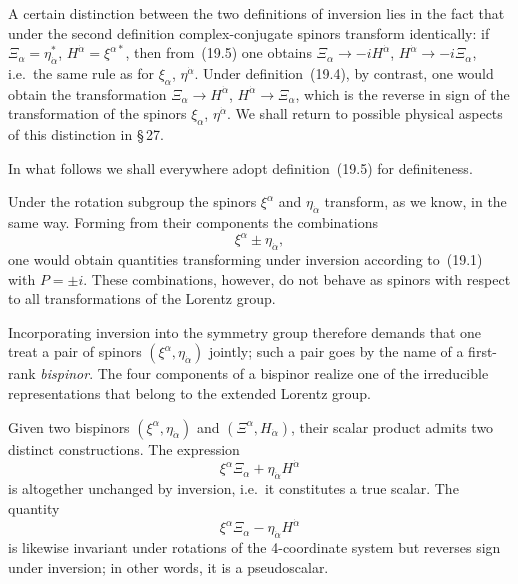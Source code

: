 A certain distinction between the two definitions of inversion lies in the fact that under the second definition complex-conjugate spinors transform identically: if $\Xi_\alpha = \eta^*_{\dot\alpha}$, $H^{\dot\alpha} = \xi^{\alpha*}$, then from~(19.5) one obtains $\Xi_\alpha \to -iH^{\dot\alpha}$, $H^{\dot\alpha} \to -i\Xi_\alpha$, i.e.\ the same rule as for $\xi_\alpha$, $\eta^{\dot\alpha}$. Under definition~(19.4), by contrast, one would obtain the transformation $\Xi_\alpha \to H^{\dot\alpha}$, $H^{\dot\alpha} \to \Xi_\alpha$, which is the reverse in sign of the transformation of the spinors $\xi_\alpha$, $\eta^{\dot\alpha}$. We shall return to possible physical aspects of this distinction in \S\,27.

In what follows we shall everywhere adopt definition~(19.5) for definiteness.

Under the rotation subgroup the spinors $\xi^\alpha$ and $\eta_{\dot\alpha}$ transform, as we know, in the same way. Forming from their components the combinations
\begin{equation}
\xi^\alpha \pm \eta_{\dot\alpha},
\tag{19.6}
\end{equation}
one would obtain quantities transforming under inversion according to~(19.1) with $P = \pm i$. These combinations, however, do not behave as spinors with respect to all transformations of the Lorentz group.

Incorporating inversion into the symmetry group therefore demands that one treat a pair of spinors $(\xi^\alpha, \eta_{\dot\alpha})$ jointly; such a pair goes by the name of a first-rank \emph{bispinor}. The four components of a bispinor realize one of the irreducible representations that belong to the extended Lorentz group.

Given two bispinors $(\xi^\alpha, \eta_{\dot\alpha})$ and $(\Xi^\alpha, H_{\dot\alpha})$, their scalar product admits two distinct constructions. The expression
\begin{equation}
\xi^\alpha\Xi_\alpha + \eta_{\dot\alpha}H^{\dot\alpha}
\tag{19.7}
\end{equation}
is altogether unchanged by inversion, i.e.\ it constitutes a true scalar. The quantity
\begin{equation}
\xi^\alpha\Xi_\alpha - \eta_{\dot\alpha}H^{\dot\alpha}
\tag{19.8}
\end{equation}
is likewise invariant under rotations of the 4-coordinate system but reverses sign under inversion; in other words, it is a pseudoscalar.

